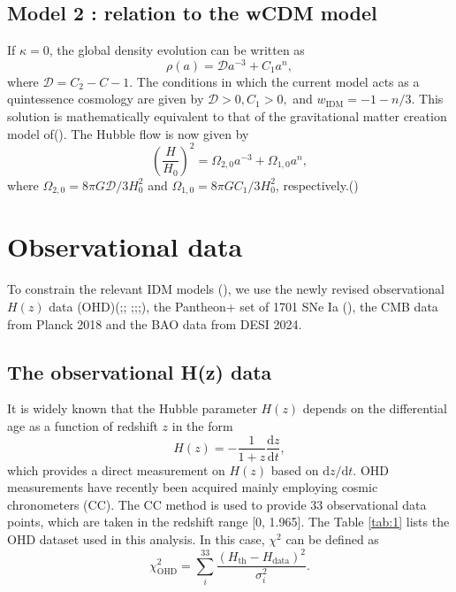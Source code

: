 \documentclass{aa}
\begin{document}
\subsection{Model 2 : relation to the wCDM model}

   If $\kappa=0$, the global density evolution can be written as
   \begin{equation}
      \rho(a)=\mathcal{D}a^{-3}+C_1a^{n},
   \end{equation}
   where $\mathcal{D}=C_2-C-1$. The conditions in which the current 
   model acts as a quintessence cosmology are given by $\mathcal{D}>0,
   C_1>0,$ and $w_{\text{IDM}}=-1-n/3$. This solution is mathematically
   equivalent to that of the gravitational matter creation model of().
   The Hubble flow is now given by
   \begin{equation}
      \left(\frac{H}{H_0}\right)^2=\Omega_{2,0}a^{-3}+\Omega_{1,0}a^{n},
   \end{equation}
   where $\Omega_{2,0}=8\pi G\mathcal{D}/3H_0^2$ and 
   $\Omega_{1,0}=8\pi GC_1/3H_0^2$, respectively.(\cite{refId0})
   
\section{Observational data}

   To constrain the relevant IDM models (\cite{refId0}), we use the newly revised
   observational $H(z)$ data (OHD)(\cite{Zhang_2014};\cite{PhysRevD.71.123001};
   \cite{M.Moresco_2012};\cite{Moresco_2016};\cite{10.1093/mnras/stx301};\cite{10.1093/mnrasl/slv037}),
   the Pantheon+ set of 1701 SNe Ia (), the CMB data from
   Planck 2018 and the BAO data from DESI 2024.

\subsection{The observational H(z) data}

   It is widely known that the Hubble parameter $H(z)$ depends on
   the differential age as a function of redshift $z$ in the form
   \begin{equation}
      H(z)=-\frac{1}{1+z}\frac{\mathrm{d}z}{\mathrm{d}t},
   \end{equation}
   which provides a direct measurement on $H(z)$ based on
   $\mathrm{d}z/\mathrm{d}t$.
   OHD measurements have recently been acquired mainly employing
   cosmic chronometers (CC). The CC method is used to provide 33 observational
   data points, which are taken in the redshift range [0, 1.965].
   The Table \ref{tab:1} lists the OHD dataset used in this analysis.
   In this case, $\chi^2$ can be defined as
   \begin{equation}
      \chi_{\text{OHD}}^2=\sum_i^{33}\frac{(H_{\text{th}}-H_{\text{data}})^2}{\sigma_i^2}.
   \end{equation}
\end{document}
